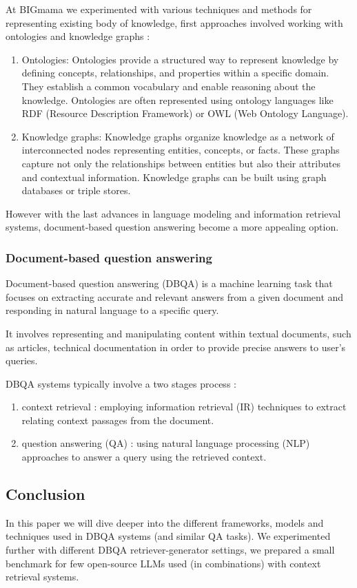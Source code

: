 \documentclass[a4paper,12pt]{article}
\begin{document}
At BIGmama we experimented with various techniques and methods for representing existing body of knowledge, 
first approaches involved working with ontologies and knowledge graphs :

\begin{enumerate}
	\item Ontologies: Ontologies provide a structured way to represent knowledge by defining concepts, relationships, and properties within a specific domain. They establish a common vocabulary and enable reasoning about the knowledge. 
	      Ontologies are often represented using ontology languages like RDF (Resource Description Framework) or OWL (Web Ontology Language).
	\item Knowledge graphs: Knowledge graphs organize knowledge as a network of interconnected nodes representing entities, concepts, or facts. 
	      These graphs capture not only the relationships between entities but also their attributes and contextual information. Knowledge graphs can be built using graph databases or triple stores.
\end{enumerate}

However with the last advances in language modeling and information retrieval systems, document-based question answering become a more appealing option.  


\subsubsection{Document-based question answering}
Document-based question answering (DBQA) is a machine learning task that focuses on extracting accurate and relevant answers from a given document and responding in natural language to a specific query. 

It involves representing and manipulating content within textual documents, such as articles, technical documentation in order to provide precise answers to user's queries.

DBQA systems typically involve a two stages process : 
\begin{enumerate}
	\item context retrieval : employing information retrieval (IR) techniques to extract relating context passages from the document.
	\item question answering (QA) : using natural language processing (NLP) approaches to answer a query using the retrieved context.  
\end{enumerate}  

\subsection{Conclusion}
In this paper we will dive deeper into the different frameworks, models and techniques used in DBQA systems (and similar QA tasks). 
We experimented further with different DBQA retriever-generator settings, we prepared a small benchmark for few open-source LLMs used (in combinations) 
with context retrieval systems.
\end{document}

